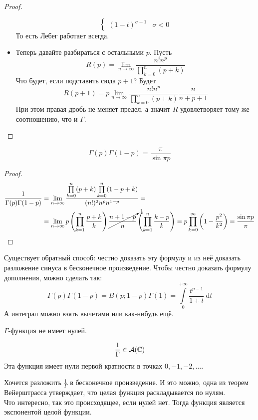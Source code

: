 \documentclass{article}
\begin{document}
\begin{proof}
\begin{itemize}
$$\begin{cases}
                (1-t)^{\sigma-1} & \sigma<0
            \end{cases}$$
            То есть Лебег работает всегда.
            \item Теперь давайте разбираться с остальными $p$. Пусть
            $$
            R(p)=\lim\limits_{n\to\infty}\frac{n!n^p}{\prod\limits_{k=0}^n(p+k)}
            $$
            Что будет, если подставить сюда $p+1$? Будет
            $$
            R(p+1)=p\lim\limits_{n\to\infty}\frac{n!n^p}{\prod\limits_{k=0}^n(p+k)}\frac n{n+p+1}
            $$
            При этом правая дробь не меняет предел, а значит $R$ удовлетворяет тому же соотношению, что и $\Gamma$.
        \end{itemize}
    \end{proof}
    \begin{property}
        $$
        \Gamma(p)\Gamma(1-p)=\frac\pi{\sin\pi p}
        $$
    \end{property}
    \begin{proof}
        \[\begin{split}
            \frac1{\Gamma(p)\Gamma(1-p)}&=\lim\limits_{n\to\infty}\frac{\prod\limits_{k=0}^n(p+k)\prod\limits_{k=0}^n(1-p+k)}{(n!)^2n^pn^{1-p}}=\\
            &=\lim\limits_{n\to\infty}p\left(\prod\limits_{k=1}^n\frac{p+k}k\right)\cancelto1{\frac{n+1-p}n}\left(\prod\limits_{k=1}^n\frac{k-p}k\right)=p\prod\limits_{k=0}^{\infty}\left(1-\frac{p^2}{k^2}\right)=\frac{\sin\pi p}\pi
        \end{split}\]
    \end{proof}
    \begin{remark}
        Существует обратный способ: честно доказать эту формулу и из неё доказать разложение синуса в бесконечное произведение. Чтобы честно доказать формулу дополнения, можно сделать так:
        $$
        \Gamma(p)\Gamma(1-p)=B(p;1-p)\Gamma(1)=\int\limits_0^{+\infty}\frac{t^{p-1}}{1+t}~\mathrm dt
        $$
        А интеграл можно взять вычетами или как-нибудь ещё.
    \end{remark}
    \begin{corollary}
        $\Gamma$-функция не имеет нулей.
    \end{corollary}
    \begin{corollary}
        $$\frac1\Gamma\in{\mathcal{A}}(\mathbb C)$$
        Эта функция имеет нули первой кратности в точках $0,-1,-2,\ldots$.
    \end{corollary}
    \begin{remark}
        Хочется разложить $\frac1\Gamma$ в бесконечное произведение. И это можно, одна из теорем Вейерштрасса утверждает, что целая функция раскладывается по нулям.\\
        Что интересно, так это происходящее, если нулей нет. Тогда функция является экспонентой целой функции.
    \end{remark}
\end{document}
